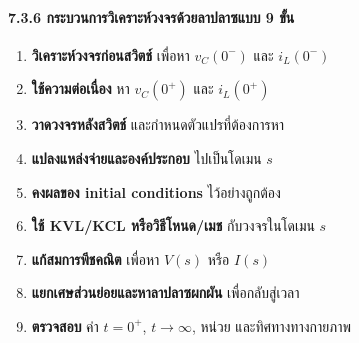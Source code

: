 \paragraph{7.3.6 กระบวนการวิเคราะห์วงจรด้วยลาปลาซแบบ 9 ขั้น}

\begin{enumerate}
    \item \textbf{วิเคราะห์วงจรก่อนสวิตช์} เพื่อหา $v_C(0^-)$ และ $i_L(0^-)$
    \item \textbf{ใช้ความต่อเนื่อง} หา $v_C(0^+)$ และ $i_L(0^+)$
    \item \textbf{วาดวงจรหลังสวิตช์} และกำหนดตัวแปรที่ต้องการหา
    \item \textbf{แปลงแหล่งจ่ายและองค์ประกอบ} ไปเป็นโดเมน $s$
    \item \textbf{คงผลของ initial conditions} ไว้อย่างถูกต้อง
    \item \textbf{ใช้ KVL/KCL หรือวิธีโหนด/เมช} กับวงจรในโดเมน $s$
    \item \textbf{แก้สมการพีชคณิต} เพื่อหา $V(s)$ หรือ $I(s)$
    \item \textbf{แยกเศษส่วนย่อยและหาลาปลาซผกผัน} เพื่อกลับสู่เวลา
    \item \textbf{ตรวจสอบ} ค่า $t=0^+$, $t\rightarrow\infty$, หน่วย และทิศทางทางกายภาพ
\end{enumerate}


